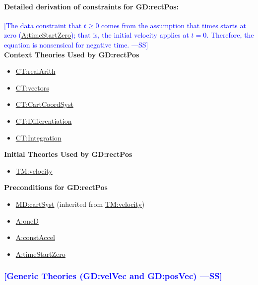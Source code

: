 \documentclass[12pt]{article}
\newcommand{\authornote}[3]{\textcolor{#1}{[#3 ---#2]}}
\newcommand{\authornote}[3]{}
\newcommand{\wss}[1]{\authornote{blue}{SS}{#1}}
\begin{document}
\paragraph{Detailed derivation of constraints for GD:rectPos:}

\wss{The data constraint that $t \geq 0$ comes from the assumption that times
starts at zero (\hyperref[timeStartZero]{A:timeStartZero}); that is, the initial
velocity applies at $t=0$.  Therefore, the equation is nonsensical for
negative time.}
~\\

\noindent \textbf{Context Theories Used by GD:rectPos}

\begin{itemize}
\item \hyperref[CT:realArith]{CT:realArith}
\item \hyperref[CT:vectors]{CT:vectors}
\item \hyperref[CT:CartCoordSyst]{CT:CartCoordSyst}
\item \hyperref[CT:Differentiation]{CT:Differentiation}
\item \hyperref[CT:Integration]{CT:Integration}
\end{itemize}

\noindent \textbf{Initial Theories Used by GD:rectPos}

\begin{itemize}
\item \hyperref[TM:velocity]{TM:velocity}
\end{itemize}

\noindent \textbf{Preconditions for GD:rectPos}

\begin{itemize}
\item \hyperref[MD:cartSyst]{MD:cartSyst} (inherited from \hyperref[TM:velocity]{TM:velocity})
\item \hyperref[oneD]{A:oneD}
\item \hyperref[constAccel]{A:constAccel}
\item \hyperref[timeStartZero]{A:timeStartZero}
\end{itemize}

\subsubsection{\wss{Generic Theories (GD:velVec and GD:posVec)}}
\end{document}
